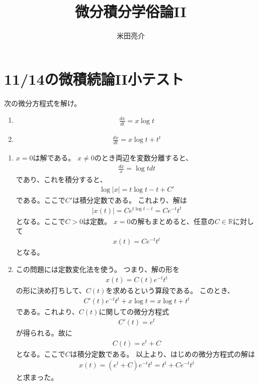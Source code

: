 \documentclass[fleqn]{jsarticle}
\begin{document}
\title{微分積分学俗論II}
\author{米田亮介}
\maketitle
\section{11/14の微積続論II小テスト}
\begin{shaded}
次の微分方程式を解け。
\begin{enumerate}
\item 
\begin{eqnarray}
\frac{dx}{dt}=x\log t
\end{eqnarray}
\item 
\begin{eqnarray}
\frac{dx}{dt}=x\log t+t^{t}
\end{eqnarray}
\end{enumerate}
\end{shaded}
\begin{enumerate}
\item 
$x=0$は解である。
$x\ne 0$のとき両辺を変数分離すると、
\begin{eqnarray}
\frac{dx}{x}=\log tdt
\end{eqnarray}
であり、これを積分すると、
\begin{eqnarray}
\log |x|=t\log t-t+C'
\end{eqnarray}
である。ここで$C'$は積分定数である。
これより、解は
\begin{eqnarray}
|x(t)|=Ce^{t\log t-t}=Ce^{-t}t^{t}
\end{eqnarray}
となる。ここで$C>0$は定数。
$x=0$の解もまとめると、任意の$C\in\mathbb{R}$に対して
\begin{eqnarray}
x(t)=Ce^{-t}t^{t}
\end{eqnarray}
となる。
\item
この問題には定数変化法を使う。
つまり、解の形を
\begin{eqnarray}
x(t)=C(t)e^{-t}t^{t}
\end{eqnarray}
の形に決め打ちして、$C(t)$を求めるという算段である。
このとき、
\begin{eqnarray}
C'(t)e^{-t}t^{t}+x\log t=x\log t+t^{t}
\end{eqnarray}
である。これより、$C(t)$に関しての微分方程式
\begin{eqnarray}
C'(t)=e^{t}
\end{eqnarray}
が得られる。故に
\begin{eqnarray}
C(t)=e^{t}+C
\end{eqnarray}
となる。ここで$C$は積分定数である。
以上より、はじめの微分方程式の解は
\begin{eqnarray}
x(t)=(e^{t}+C)e^{-t}t^{t}=t^{t}+Ce^{-t}t^{t}
\end{eqnarray}
と求まった。
\end{enumerate}
\end{document}
